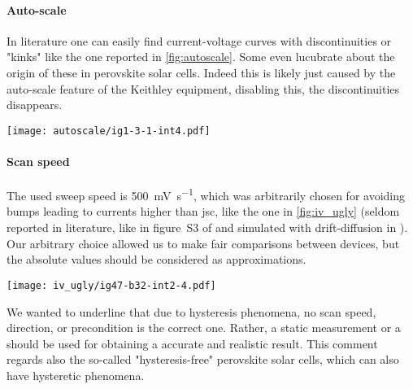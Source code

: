 	\paragraph{Auto-scale}\label{autoscale} In literature one can easily find current-voltage curves with discontinuities or "kinks" \cite{Li2016,Snaith2014,Zhang2015} like the one reported in \cref{fig:autoscale}.
	Some even lucubrate about the origin of these in perovskite solar cells.
	Indeed this is likely just caused by the auto-scale feature of the Keithley equipment, disabling this, the discontinuities disappears.

	\begin{SCfigure}%
		\centering
		\texttt{[image: autoscale/ig1-3-1-int4.pdf]}
		\label{fig:autoscale}
	\end{SCfigure}

	\paragraph{Scan speed} The used sweep speed is \SI{500}{\mV\per\s}, which was arbitrarily chosen for avoiding bumps leading to currents higher than \gls{jsc}, like the one in \cref{fig:iv_ugly} (seldom reported in literature, like in figure~S3 of \cite{Du2018} and simulated with drift-diffusion in \cite{Walter2018}).
	Our arbitrary choice allowed us to make fair comparisons between devices, but the absolute values should be considered as approximations.
	\begin{SCfigure}%
		\centering
		\texttt{[image: iv\_ugly/ig47-b32-int2-4.pdf]}
		\label{fig:iv_ugly}
	\end{SCfigure}
	We wanted to underline that due to hysteresis phenomena, no scan speed, direction, or precondition is the correct one.
	Rather, a static measurement or a  should be used for obtaining a accurate and realistic result.
	This comment regards also the so-called "hysteresis-free" perovskite solar cells, which can also have hysteretic phenomena\cite{Jacobs2018,Du2018}.

